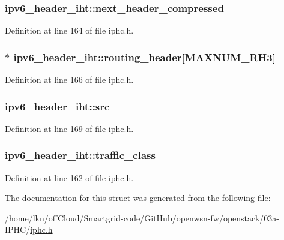 \subsubsection[{\texorpdfstring{next\+\_\+header\+\_\+compressed}{next_header_compressed}}]{ ipv6\+\_\+header\+\_\+iht\+::next\+\_\+header\+\_\+compressed}\hypertarget{structipv6__header__iht_afa37d6d6b4cd2317e9ea631413f4d7af}{}\label{structipv6__header__iht_afa37d6d6b4cd2317e9ea631413f4d7af}


Definition at line 164 of file iphc.\+h.

\subsubsection[{\texorpdfstring{routing\+\_\+header}{routing_header}}]{$\ast$ ipv6\+\_\+header\+\_\+iht\+::routing\+\_\+header\mbox{[}{\bf M\+A\+X\+N\+U\+M\+\_\+\+R\+H3}\mbox{]}}\hypertarget{structipv6__header__iht_a5b9de4d76a74c92aabf1c0fae933166a}{}\label{structipv6__header__iht_a5b9de4d76a74c92aabf1c0fae933166a}


Definition at line 166 of file iphc.\+h.

\subsubsection[{\texorpdfstring{src}{src}}]{ ipv6\+\_\+header\+\_\+iht\+::src}\hypertarget{structipv6__header__iht_a09de10b33e8ee4f4484d8818543296ee}{}\label{structipv6__header__iht_a09de10b33e8ee4f4484d8818543296ee}


Definition at line 169 of file iphc.\+h.

\subsubsection[{\texorpdfstring{traffic\+\_\+class}{traffic_class}}]{ ipv6\+\_\+header\+\_\+iht\+::traffic\+\_\+class}\hypertarget{structipv6__header__iht_a4f95e94a16a1fe4432cd085c8a853460}{}\label{structipv6__header__iht_a4f95e94a16a1fe4432cd085c8a853460}


Definition at line 162 of file iphc.\+h.



The documentation for this struct was generated from the following file\+:\begin{DoxyCompactItemize}
\item 
/home/lkn/off\+Cloud/\+Smartgrid-\/code/\+Git\+Hub/openwsn-\/fw/openstack/03a-\/\+I\+P\+H\+C/\hyperlink{iphc_8h}{iphc.\+h}\end{DoxyCompactItemize}
